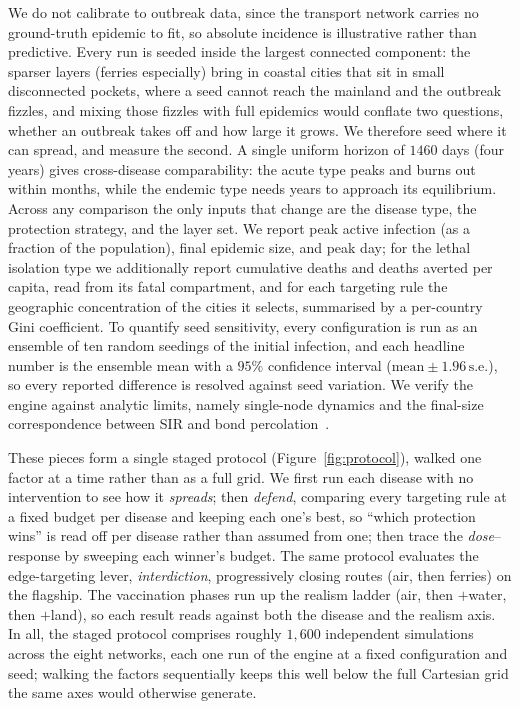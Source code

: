 We do not calibrate to outbreak data, since the transport network carries no ground-truth epidemic
to fit, so absolute incidence is illustrative rather than predictive. Every run is seeded inside the
largest connected component: the sparser layers (ferries especially) bring in coastal cities that
sit in small disconnected pockets, where a seed cannot reach the mainland and the outbreak fizzles,
and mixing those fizzles with full epidemics would conflate two questions, whether an outbreak takes
off and how large it grows. We therefore seed where it can spread, and measure the second. A single
uniform horizon of $1460$ days (four years) gives cross-disease comparability: the acute type peaks
and burns out within months, while the endemic type needs years to approach its equilibrium. Across
any comparison the only inputs that change are the disease type, the protection strategy, and the
layer set. We report peak active infection (as a fraction of the population), final epidemic size,
and peak day; for the lethal isolation type we additionally report cumulative deaths and deaths
averted per capita, read from its fatal compartment, and for each targeting rule the geographic
concentration of the cities it selects, summarised by a per-country Gini coefficient. To quantify
seed sensitivity, every configuration is run as an ensemble of ten random seedings of the initial
infection, and each headline number is the ensemble mean with a $95\%$ confidence interval
($\text{mean}\pm1.96\,\text{s.e.}$), so every reported difference is resolved against seed variation.
We verify the engine against analytic limits, namely single-node dynamics and the final-size
correspondence between SIR and bond percolation~\cite{newman:spread}.

These pieces form a single staged protocol (Figure~\ref{fig:protocol}), walked one factor at a time
rather than as a full grid. We first run each disease with no intervention to see how it
\emph{spreads}; then \emph{defend}, comparing every targeting rule at a fixed budget per disease and
keeping each one's best, so ``which protection wins'' is read off per disease rather than assumed
from one; then trace the \emph{dose}--response by sweeping each winner's budget. The same protocol
evaluates the edge-targeting lever, \emph{interdiction}, progressively closing routes (air, then
ferries) on the flagship. The vaccination phases run up the realism ladder (air, then $+$water, then
$+$land), so each result reads against both the disease and the realism axis. In all, the staged
protocol comprises roughly $1{,}600$ independent simulations across the eight networks, each one run
of the engine at a fixed configuration and seed; walking the factors sequentially keeps this well
below the full Cartesian grid the same axes would otherwise generate.

